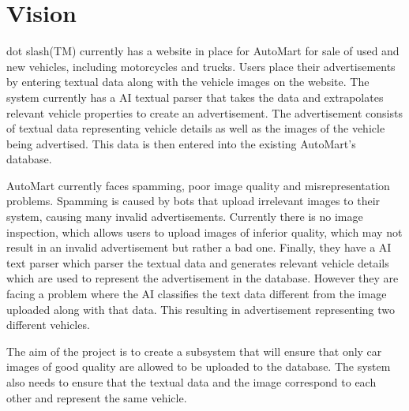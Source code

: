 \section{Vision}
dot slash(TM) currently has a website in place for AutoMart for sale of used and new vehicles, including motorcycles and trucks. Users place their advertisements by entering textual data along with the vehicle images on the website. The system currently has a AI textual parser that takes the data and extrapolates relevant vehicle properties to create an advertisement. The advertisement consists of textual data representing vehicle details as well as the images of the vehicle being advertised. This data is then entered into the existing AutoMart's database.

AutoMart currently faces spamming, poor image quality and misrepresentation problems. Spamming is caused by bots that upload irrelevant images to their system, causing many invalid advertisements. Currently there is no image inspection, which allows users to upload images of inferior quality, which may not result in an invalid advertisement but rather a bad one. Finally, they have a AI text parser which parser the textual data and generates relevant vehicle details which are used to represent the advertisement in the database. However they are facing a problem where the AI classifies the text data different from the image uploaded along with that data. This resulting in advertisement representing two different vehicles.

The aim of the project is to create a subsystem that will ensure that only car images of good quality are allowed to be uploaded to the database. The system also needs to ensure that the textual data and the image correspond to each other and represent the same vehicle. 